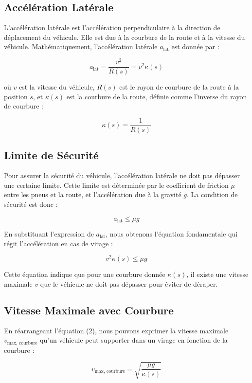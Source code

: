 \documentclass[a4paper,12pt]{article}
\begin{document}
\subsection{Accélération Latérale}

L'accélération latérale est l'accélération perpendiculaire à la direction de déplacement du véhicule. Elle est due à la courbure de la route et à la vitesse du véhicule. Mathématiquement, l'accélération latérale \( a_{\text{lat}} \) est donnée par :

\[
a_{\text{lat}} = \frac{v^2}{R(s)} = v^2 \kappa(s)
\]

où \( v \) est la vitesse du véhicule, \( R(s) \) est le rayon de courbure de la route à la position \( s \), et \( \kappa(s) \) est la courbure de la route, définie comme l'inverse du rayon de courbure :

\[
\kappa(s) = \frac{1}{R(s)}
\]

\subsection{Limite de Sécurité}

Pour assurer la sécurité du véhicule, l'accélération latérale ne doit pas dépasser une certaine limite. Cette limite est déterminée par le coefficient de friction \( \mu \) entre les pneus et la route, et l'accélération due à la gravité \( g \). La condition de sécurité est donc :

\[
a_{\text{lat}} \leq \mu g
\]

En substituant l'expression de \( a_{\text{lat}} \), nous obtenons l'équation fondamentale qui régit l'accélération en cas de virage :

\[
v^2 \kappa(s) \leq \mu g \tag{1}
\]

Cette équation indique que pour une courbure donnée \( \kappa(s) \), il existe une vitesse maximale \( v \) que le véhicule ne doit pas dépasser pour éviter de déraper.

\subsection{Vitesse Maximale avec Courbure}

En réarrangeant l'équation (2), nous pouvons exprimer la vitesse maximale \( v_{\text{max, courbure}} \) qu'un véhicule peut supporter dans un virage en fonction de la courbure :

\[
v_{\text{max, courbure}} = \sqrt{\frac{\mu g}{\kappa(s)}}
\]
\end{document}

